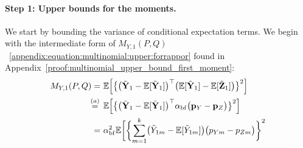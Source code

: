 \documentclass[twoside,11pt]{article}
\newcommand{\rvTwo}{Y}
\newcommand{\rvThree}{Z}
\newcommand{\vectorize}[1]{\mathbf{#1}}
\newcommand{\private}[1]{\tilde{#1}}
\newcommand{\mE}{\mathbb{E}} %
\newcommand{\alphabetSize}{k} %
\newcommand{\vectorIndex}{m}
\newcommand{\probVecElement}[2]{p_{{#1}{#2}}}
\newcommand{\probVec}{\mathbf{p}} %
\newcommand{\kernelMoment}{M} %
\newcommand{\dataGenDist}{P}  %
\newcommand{\privacyMechanism}{Q}
\newcommand{\privacyParameter}{\alpha} %
\newcommand{\privacyParameterrappor}{\privacyParameter_{\mathrm{bf}}}
\newcommand{\momentTwosampleVarCondexpY}{\kernelMoment_{\rvTwo,1}(\dataGenDist, \privacyMechanism)}
\newcommand{\ilmun}[1]{
	{ \color{blue} Ilmun: #1}
}
\begin{document}
\begin{appendix}
	\paragraph{Step 1: Upper bounds for the moments.}
	We start by bounding the variance of conditional expectation terms. We begin with the intermediate form of $\momentTwosampleVarCondexpY$~\eqref{appendix:equation:multinomial:upper:forrappor} found in Appendix~\ref{proof:multinomial_upper_bound_first_moment}:
	\begin{align*}
		\momentTwosampleVarCondexpY
		= ~ &
		\mE %
		\Bigl[ %
		\bigl\{ %
		\bigl( %
		\tilde{\vectorize{\rvTwo}}_1
		- %
		\mE [ \tilde{\vectorize{\rvTwo}}_{1}]
		\bigr)^\top %
		\bigl( %
		\mE [ \tilde{\vectorize{\rvTwo}}_{1}]
		- %
		\mE [ \tilde{\vectorize{\rvThree}}_{1}]
		\bigr) %
		\bigr\}^2 %
		\Bigr] %
		\\ \stackrel{(a)}{=} \hskip 1.57mm &
		\mE %
		\Bigl[ %
		\bigl\{ %
		\bigl( %
		\tilde{\vectorize{\rvTwo}}_1
		- %
		\mE [ \tilde{\vectorize{\rvTwo}}_{1}]
		\bigr)^\top %
		\privacyParameterrappor
		\bigl( %
		\probVec_{\rvTwo}
		- %
		\probVec_{\rvThree}
		\bigr) %
		\bigr\}^2 %
		\Bigr] %
		\\= ~&
		\privacyParameterrappor^2
		\mE %
		\biggl[ %
		\biggl\{ %
		\sum_{\vectorIndex=1}^\alphabetSize
		\bigl( %
		\private{\rvTwo}_{1 \vectorIndex}
		- %
		\mE [ \private{\rvTwo}_{1 \vectorIndex}]
		\bigr) %
		\bigl( %
		\probVecElement{\rvTwo}{\vectorIndex}
		- %
		\probVecElement{\rvThree}{\vectorIndex}
		\bigr) %
		\biggr\}^2 %

\end{align*}
\end{appendix}
\end{document}
